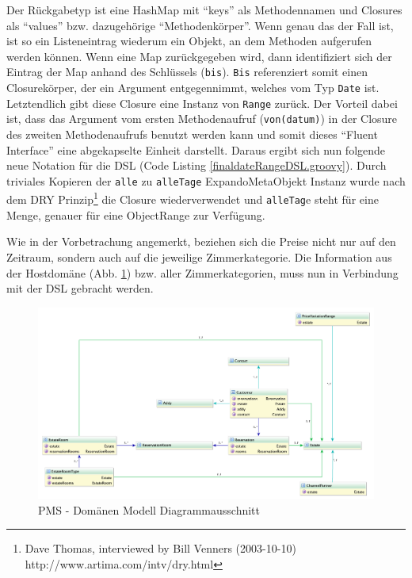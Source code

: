 \documentclass[11pt,english,ngerman, headsepline]{scrreprt}
\begin{document}
Der Rückgabetyp ist eine HashMap mit ``keys'' als Methodennamen und Closures als
``values'' bzw. dazugehörige ``Methodenkörper''.
Wenn genau das der Fall ist, ist so ein Listeneintrag wiederum ein Objekt, an
dem Methoden aufgerufen werden können. Wenn eine Map zurückgegeben wird, dann
identifiziert sich der Eintrag der Map anhand des Schlüssels (\texttt{bis}).
\texttt{Bis} referenziert somit einen Closurekörper, der ein Argument entgegennimmt,
welches vom Typ \texttt{Date} ist. Letztendlich gibt diese Closure eine Instanz
von \texttt{Range} zurück. Der Vorteil dabei ist, dass das Argument vom ersten
Methodenaufruf (\texttt{von(datum)}) in der Closure des zweiten Methodenaufrufs
benutzt werden kann und somit dieses ``Fluent Interface'' eine abgekapselte
Einheit darstellt.
Daraus ergibt sich nun folgende neue Notation für die DSL (Code Listing
\ref{finaldateRangeDSL.groovy}).
Durch triviales Kopieren der \texttt{alle} zu \texttt{alleTage} ExpandoMetaObjekt
Instanz wurde nach dem DRY Prinzip\footnote{Dave Thomas, interviewed by Bill Venners
(2003-10-10) http://www.artima.com/intv/dry.html} die Closure
wiederverwendet und \texttt{alleTag}e steht für eine Menge, genauer für eine
ObjectRange zur Verfügung.


 
Wie in der Vorbetrachung angemerkt, beziehen sich die Preise nicht nur auf den
Zeitraum, sondern auch auf die jeweilige Zimmerkategorie.
Die Information aus der Hostdomäne (Abb. \ref{domainModelDia.png}) bzw. aller
Zimmerkategorien, muss nun in Verbindung mit der DSL gebracht werden.

 
\begin{figure}[h!]
	\begin{center}
	\includegraphics[width=1.3\textwidth,angle=90]{pics/domainModelDia.png}
	\end{center}
	\caption{PMS - Domänen Modell Diagrammausschnitt}
	\label{domainModelDia.png}
\end{figure}
\end{document}
